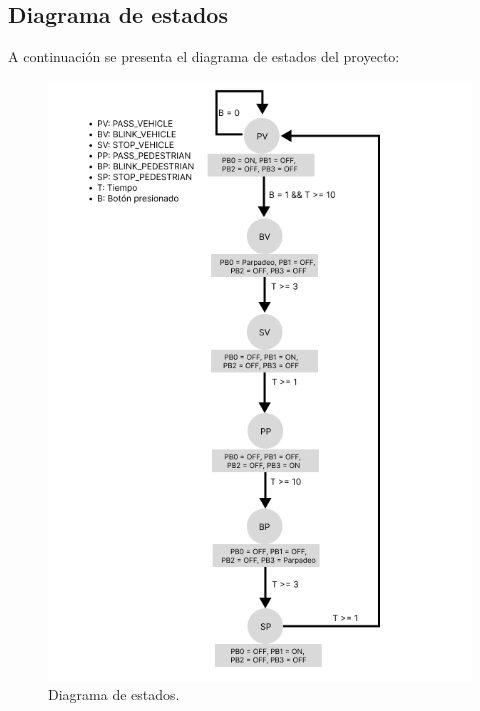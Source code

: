 \subsection{Diagrama de estados}
A continuación se presenta el diagrama de estados del proyecto:
\begin{figure}[H]
    \centering
    \includegraphics[scale=0.5]{images/Maquina de estados.png}
    \caption{Diagrama de estados.}
    \label{fig:diagrama_estados}
\end{figure}

\newpage
